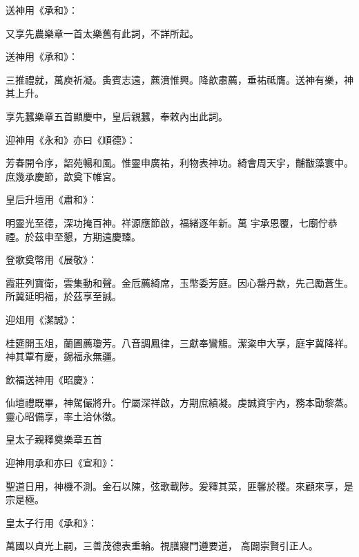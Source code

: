 \begin{pinyinscope}
 送神用《承和》：



 又享先農樂章一首太樂舊有此詞，不詳所起。



 送神用《承和》：



 三推禮就，萬庾祈凝。夤賓志遠，藨濆惟興。降歆肅薦，垂祐祗膺。送神有樂，神其上升。



 享先蠶樂章五首顯慶中，皇后親蠶，奉敕內出此詞。



 迎神用《永和》亦曰《順德》：



 芳春開令序，韶苑暢和風。惟靈申廣祐，利物表神功。綺會周天宇，黼黻藻寰中。庶幾承慶節，歆奠下帷宮。



 皇后升壇用《肅和》：



 明靈光至德，深功掩百神。祥源應節啟，福緒逐年新。萬
 宇承恩覆，七廟佇恭禋。於茲申至懇，方期遠慶臻。



 登歌奠幣用《展敬》：



 霞莊列寶衛，雲集動和聲。金卮薦綺席，玉幣委芳庭。因心罄丹款，先己勵蒼生。所冀延明福，於茲享至誠。



 迎俎用《潔誠》：



 桂筵開玉俎，蘭圃薦瓊芳。八音調鳳律，三獻奉鸞觴。潔粢申大享，庭宇冀降祥。神其覃有慶，錫福永無疆。



 飲福送神用《昭慶》：



 仙壇禮既畢，神駕儼將升。佇屬深祥啟，方期庶績凝。虔誠資宇內，務本勖黎蒸。靈心昭備享，率土洽休徵。



 皇太子親釋奠樂章五首



 迎神用承和亦曰《宣和》：



 聖道日用，神機不測。金石以陳，弦歌載陟。爰釋其菜，匪馨於稷。來顧來享，是宗是極。



 皇太子行用《承和》：



 萬國以貞光上嗣，三善茂德表重輪。視膳寢門遵要道，
 高闢崇賢引正人。




\end{pinyinscope}
